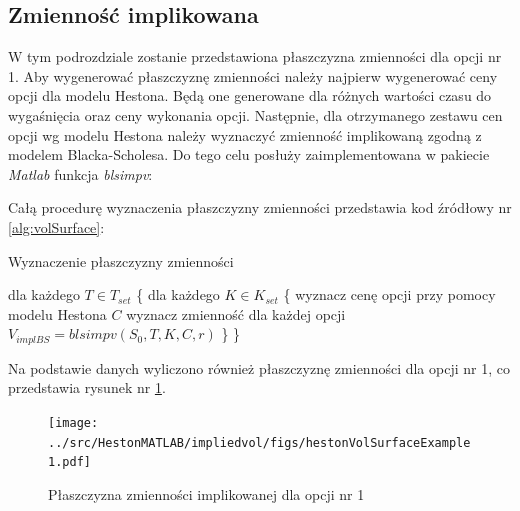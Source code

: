 \documentclass{pracamgr}
\begin{document}
\subsection{Zmienność implikowana}
W tym podrozdziale zostanie przedstawiona płaszczyzna zmienności dla opcji nr 1.
Aby wygenerować płaszczyznę zmienności należy najpierw wygenerować ceny opcji
dla modelu Hestona. Będą one generowane dla różnych wartości czasu do wygaśnięcia 
oraz ceny wykonania opcji. Następnie, dla otrzymanego zestawu cen opcji wg modelu 
Hestona należy wyznaczyć zmienność implikowaną zgodną z modelem Blacka-Scholesa.
Do tego celu posłuży zaimplementowana w pakiecie \textit{Matlab} funkcja \textit{blsimpv}:

Całą procedurę wyznaczenia płaszczyzny zmienności przedstawia kod źródłowy nr \ref{alg:volSurface}:
\begin{algorithm}[H]
\caption{Wyznaczenie płaszczyzny zmienności}\label{euclid}
\begin{algorithmic}[1]
  \State dla każdego $T \in T_{set}$ \{
  \State \hspace{\algorithmicindent} dla każdego $K \in K_{set}$ \{
  \State \hspace{\algorithmicindent} \hspace{\algorithmicindent} wyznacz cenę opcji 
          przy pomocy modelu Hestona $C$
  \State \hspace{\algorithmicindent} \hspace{\algorithmicindent} wyznacz zmienność dla 
          każdej opcji $V_{implBS} = blsimpv(S_0, T, K, C, r)$
  \State \hspace{\algorithmicindent} \}
  \State \} 
\end{algorithmic}
\label{alg:volSurface}
\end{algorithm}
Na podstawie danych wyliczono również płaszczyznę zmienności dla 
opcji nr 1, co przedstawia rysunek nr \ref{fig:hestonVolSurfaceExample1}. 

\begin{figure}[ht!]
  \centering
  \texttt{[image: ../src/HestonMATLAB/impliedvol/figs/hestonVolSurfaceExample1.pdf]}
  \caption{Płaszczyzna zmienności implikowanej dla opcji nr 1}
  \label{fig:hestonVolSurfaceExample1}
\end{figure}
\end{document}
